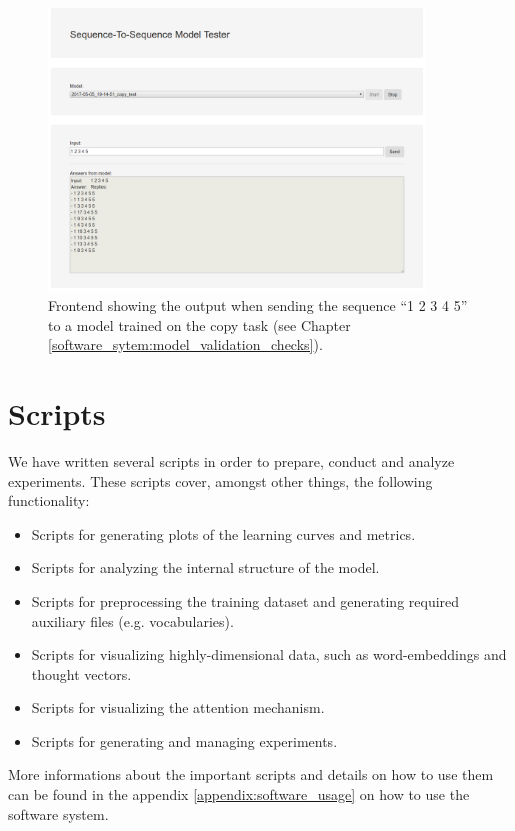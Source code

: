 \begin{figure}[H]
	\centering
	\includegraphics[width=10cm]{img/web_frontend_inference}
	\caption{Frontend showing the output when sending the sequence ``1 2 3 4 5'' to a model trained on the copy task (see Chapter \ref{software_sytem:model_validation_checks}).}
\end{figure}

\section{Scripts}
We have written several scripts in order to prepare, conduct and analyze experiments. These scripts cover, amongst other things, the following functionality:

\begin{itemize}[noitemsep]
	\item Scripts for generating plots of the learning curves and metrics.
	\item Scripts for analyzing the internal structure of the model.
	\item Scripts for preprocessing the training dataset and generating required auxiliary files (e.g. vocabularies).
	\item Scripts for visualizing highly-dimensional data, such as word-embeddings and thought vectors.
	\item Scripts for visualizing the attention mechanism.
	\item Scripts for generating and managing experiments.
\end{itemize}

More informations about the important scripts and details on how to use them can be found in the appendix \ref{appendix:software_usage} on how to use the software system.

